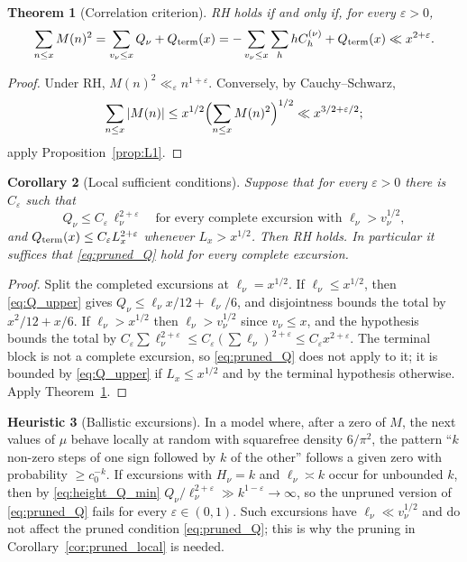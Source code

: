\documentclass[11pt]{amsart}
\numberwithin{equation}{section}
\theoremstyle{plain}
\newtheorem{theorem}{Theorem}[section]
\newtheorem{corollary}[theorem]{Corollary}
\theoremstyle{definition}
\newtheorem{heuristic}[theorem]{Heuristic}
\theoremstyle{remark}
\newcommand{\eps}{\varepsilon}
\begin{document}
\begin{theorem}[Correlation criterion]
\label{thm:corr-criterion}
RH holds if and only if, for every $\eps>0$,
\begin{equation}
\label{eq:RH-corr}
  \sum_{n\le x}M(n)^2=\sum_{v_\nu\le x}Q_\nu+Q_{\rm term}(x)
  =-\sum_{v_\nu\le x}\sum_{h}hC^{(\nu)}_h+Q_{\rm term}(x)\ll x^{2+\eps}.
\end{equation}
\end{theorem}

\begin{proof}
Under RH, $M(n)^2\ll_\eps n^{1+\eps}$. Conversely, by Cauchy--Schwarz,
\[
\sum_{n\le x}|M(n)|\le x^{1/2}\Bigl(\sum_{n\le x}M(n)^2\Bigr)^{1/2}\ll x^{3/2+\eps/2};
\]
apply
Proposition~\ref{prop:L1}.
\end{proof}

\begin{corollary}[Local sufficient conditions]
\label{cor:local-corr-sufficient}
\label{cor:pruned_local}
Suppose that for every $\eps>0$ there is $C_\eps$ such that
\begin{equation}
\label{eq:pruned_Q}
  Q_\nu\le C_\eps\,\ell_\nu^{2+\eps}\quad\text{for every complete excursion with }
  \ell_\nu>v_\nu^{1/2},
\end{equation}
and $Q_{\rm term}(x)\le C_\eps L_x^{2+\eps}$ whenever $L_x>x^{1/2}$. Then RH
holds. In particular it suffices that \eqref{eq:pruned_Q} hold for every
complete excursion.
\end{corollary}

\begin{proof}
Split the completed excursions at $\ell_\nu=x^{1/2}$. If
$\ell_\nu\le x^{1/2}$, then \eqref{eq:Q_upper} gives
$Q_\nu\le\ell_\nu x/12+\ell_\nu/6$, and disjointness bounds the total by
$x^2/12+x/6$. If $\ell_\nu>x^{1/2}$ then $\ell_\nu>v_\nu^{1/2}$ since
$v_\nu\le x$, and the hypothesis bounds the total by
$C_\eps\sum\ell_\nu^{2+\eps}\le C_\eps(\sum\ell_\nu)^{2+\eps}\le C_\eps x^{2+\eps}$.
The terminal block is not a complete excursion, so \eqref{eq:pruned_Q} does
not apply to it; it is bounded by \eqref{eq:Q_upper} if $L_x\le x^{1/2}$
and by the terminal hypothesis otherwise. Apply Theorem~\ref{thm:corr-criterion}.
\end{proof}

\begin{heuristic}[Ballistic excursions]
\label{heu:local_fails}
In a model where, after a zero of $M$, the next values of $\mu$ behave
locally at random with squarefree density $6/\pi^2$, the pattern ``$k$
non-zero steps of one sign followed by $k$ of the other'' follows a given
zero with probability $\ge c_0^{-k}$. If excursions with $H_\nu=k$ and
$\ell_\nu\asymp k$ occur for unbounded $k$, then by \eqref{eq:height_Q_min}
$Q_\nu/\ell_\nu^{2+\eps}\gg k^{1-\eps}\to\infty$, so the unpruned version of
\eqref{eq:pruned_Q} fails for every $\eps\in(0,1)$. Such excursions have
$\ell_\nu\ll v_\nu^{1/2}$ and do not affect the pruned condition
\eqref{eq:pruned_Q}; this is why the pruning in
Corollary~\ref{cor:pruned_local} is needed.
\end{heuristic}
\end{document}
